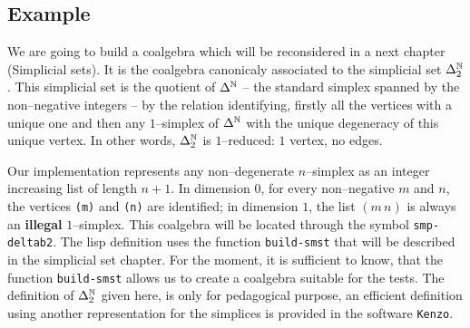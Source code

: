 \subsection* {Example}

We  are going to build a coalgebra  which will be reconsidered in a next chapter (Simplicial sets).
It is the coalgebra canonicaly associated to the simplicial set $\Delta_2^{{\mathbb{N}}}$. This simplicial set is the
quotient of $\Delta^{{\mathbb{N}}}$ -- the standard simplex spanned by the non--negative integers -- by the relation
identifying, firstly all the vertices with a unique one  and then any $1$--simplex of $\Delta^{{\mathbb{N}}}$ with the
unique degeneracy of this unique vertex. In other words, $\Delta_2^{{\mathbb{N}}}$ is $1$--reduced: $1$ vertex, no edges. \par
Our implementation represents any non--degenerate $n$--simplex as an integer increasing list of length $n+1$.
In dimension $0$, for every non--negative $m$ and $n$, the vertices {\tt (m)} and {\tt (n)} are identified; in
dimension $1$, the list $(m\, n)$ is always an {\bf illegal} $1$--simplex.
This coalgebra will be located through the symbol {\tt smp-deltab2}. The lisp definition uses the function
{\tt build-smst} that will be described in the simplicial set chapter. For the moment, it is
sufficient to know, that the function {\tt build-smst} allows us to create a coalgebra
suitable for the tests. The definition  of $\Delta_2^{{\mathbb{N}}}$ given here, is only for pedagogical
purpose, an efficient definition    using another representation for the simplices
is provided in the software {\tt Kenzo}.

